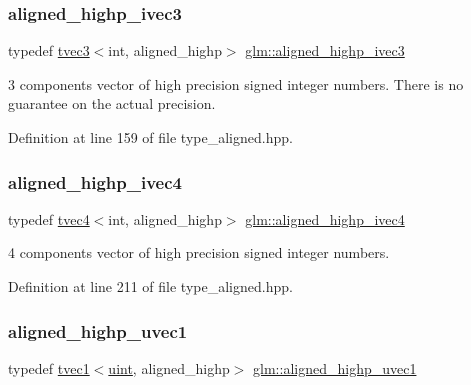 \subsubsection{\texorpdfstring{aligned\_highp\_ivec3}{aligned\_highp\_ivec3}}
{\footnotesize\ttfamily typedef \mbox{\hyperlink{structglm_1_1tvec3}{tvec3}}$<$int, aligned\+\_\+highp$>$ \mbox{\hyperlink{group__gtc__type__aligned_gac7f1892e381baa066488c0b6d1bf16ad}{glm\+::aligned\+\_\+highp\+\_\+ivec3}}}

3 components vector of high precision signed integer numbers. There is no guarantee on the actual precision. 

Definition at line 159 of file type\+\_\+aligned.\+hpp.

\mbox{\label{group__gtc__type__aligned_ga4dcc1c7c3d087b9f61635069fc97671b}} 
\subsubsection{\texorpdfstring{aligned\_highp\_ivec4}{aligned\_highp\_ivec4}}
{\footnotesize\ttfamily typedef \mbox{\hyperlink{structglm_1_1tvec4}{tvec4}}$<$int, aligned\+\_\+highp$>$ \mbox{\hyperlink{group__gtc__type__aligned_ga4dcc1c7c3d087b9f61635069fc97671b}{glm\+::aligned\+\_\+highp\+\_\+ivec4}}}



4 components vector of high precision signed integer numbers. 



Definition at line 211 of file type\+\_\+aligned.\+hpp.

\mbox{\label{group__gtc__type__aligned_ga14fec93434c0b98ff5318e49a1ae9185}} 
\subsubsection{\texorpdfstring{aligned\_highp\_uvec1}{aligned\_highp\_uvec1}}
{\footnotesize\ttfamily typedef \mbox{\hyperlink{structglm_1_1tvec1}{tvec1}}$<$\mbox{\hyperlink{group__core__precision_ga4fd29415871152bfb5abd588334147c8}{uint}}, aligned\+\_\+highp$>$ \mbox{\hyperlink{group__gtc__type__aligned_ga14fec93434c0b98ff5318e49a1ae9185}{glm\+::aligned\+\_\+highp\+\_\+uvec1}}}



